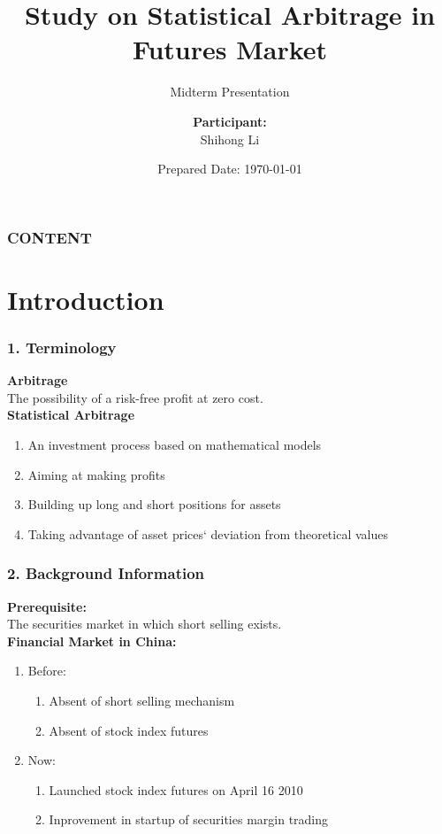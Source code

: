 \documentclass[compress,handout,10pt]{beamer}
\title{{\color{black} \LARGE Study on Statistical Arbitrage in Futures Market\newline} }
\subtitle{{\color{black} Midterm Presentation\large } }
\author{ 
    {\bf{Participant:}} \\ 
Shihong Li\\ 
    \vspace{5pt}
}
\institute{
{\bf{Sponsor:}}\\
Greenwoods Asset Management Ltd.\\
\vspace{5pt}
}
\date{\mygreen Prepared Date: \today}
\let\olditem\item
\renewcommand{\item}{\setlength{\itemsep}{0.5\baselineskip}\olditem}
\begin{document}
\begin{frame}[plain]
    \titlepage
\end{frame}

\begin{frame}
    \frametitle{CONTENT}
    \tableofcontents
\end{frame}

\section{Introduction}

\begin{frame}
    \frametitle{1. Terminology}
{\bf{Arbitrage}} \\The possibility of a risk-free profit at zero cost. \\
\vspace{7pt}
{\bf{Statistical Arbitrage}}
             \begin{enumerate}
                 \item An investment process based on mathematical models
                 \item Aiming at making profits
                 \item Building up long and short positions for assets
                 \item Taking advantage of asset prices` deviation from theoretical values
             \end{enumerate}
\end{frame}

\begin{frame}
    \frametitle{2. Background Information}
{\bf{Prerequisite:}}\\
\vspace{3pt}
The securities market in which short selling exists.\\
\vspace{7pt}
{\bf{Financial Market in China:}}\\
    \begin{enumerate}
        \item Before: 
            \begin{enumerate}
                \item Absent of short selling mechanism
                \item Absent of stock index futures
            \end{enumerate}
        \item Now:
            \begin{enumerate}
                \item Launched stock index futures on April 16 2010
                \item Inprovement in startup of securities margin trading
            \end{enumerate}
    \end{enumerate}
\end{frame}
\end{document}
